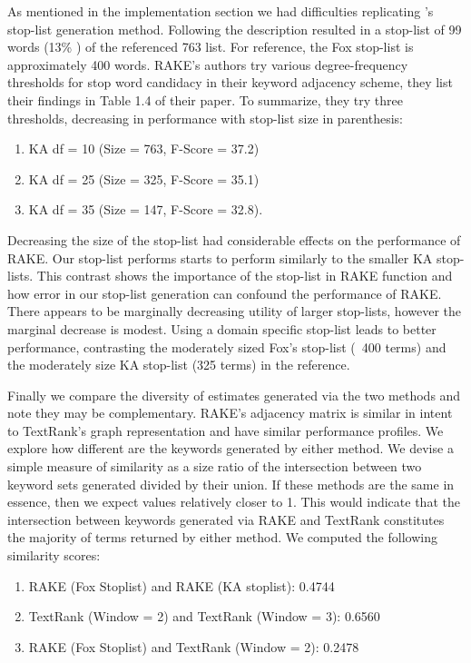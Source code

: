 \documentclass[11pt,a4paper]{article}
\begin{document}
As mentioned in the implementation section we had difficulties replicating \citet{1}'s stop-list generation method. Following the description resulted in a stop-list of 99 words (13\% ) of the referenced 763 list. For reference, the Fox stop-list is approximately 400 words. RAKE's authors try various degree-frequency thresholds for stop word candidacy in their keyword adjacency scheme, they list their findings in Table 1.4 of their paper. To summarize, they try three thresholds, decreasing in performance with stop-list size in parenthesis: 
\begin{enumerate}
	\small \itemsep0em 

	\item KA df = 10 (Size = 763, F-Score = 37.2)
	\item KA df = 25 (Size = 325, F-Score = 35.1)
	\item KA df = 35 (Size = 147, F-Score = 32.8).
	
\normalsize
\end{enumerate}  

Decreasing the size of the stop-list had considerable effects on the performance of RAKE. Our stop-list performs starts to perform similarly to the smaller KA stop-lists.  This contrast shows the importance of the stop-list in RAKE function and how error in our stop-list generation can confound the performance of RAKE. There appears to be marginally decreasing utility of larger stop-lists, however the marginal decrease is modest. Using a domain specific stop-list leads to better performance, contrasting the moderately sized Fox's stop-list (~400 terms) and the moderately size KA stop-list (325 terms) in the reference. 

Finally we compare the diversity of estimates generated via the two methods and note they may be complementary. RAKE's adjacency matrix is similar in intent to TextRank's graph representation and have similar performance profiles. We explore how different are the keywords generated by either method. We devise a simple measure of similarity as a size ratio of the intersection between two keyword sets generated divided by their union. If these methods are the same in essence, then we expect values relatively closer to 1. This would indicate that the intersection between keywords generated via RAKE and TextRank constitutes the majority of terms returned by either method. We computed the following similarity scores:
\begin{enumerate}
	\small \itemsep0em 

	\item RAKE (Fox Stoplist) and RAKE (KA stoplist): 0.4744
	\item TextRank (Window = 2) and TextRank (Window = 3):  0.6560
	\item RAKE (Fox Stoplist) and TextRank (Window = 2): 0.2478
\normalsize
\end{enumerate}  
\end{document}
